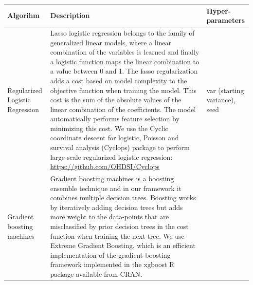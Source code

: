 \documentclass[]{article}
\begin{document}
\begin{longtable}[]{@{}lll@{}}
\toprule
\begin{minipage}[b]{0.12\columnwidth}\raggedright\strut
Algorihm\strut
\end{minipage} & \begin{minipage}[b]{0.55\columnwidth}\raggedright\strut
Description\strut
\end{minipage} & \begin{minipage}[b]{0.25\columnwidth}\raggedright\strut
Hyper-parameters\strut
\end{minipage}\tabularnewline
\midrule
\endhead
\begin{minipage}[t]{0.12\columnwidth}\raggedright\strut
Regularized Logistic Regression\strut
\end{minipage} & \begin{minipage}[t]{0.55\columnwidth}\raggedright\strut
Lasso logistic regression belongs to the family of generalized linear
models, where a linear combination of the variables is learned and
finally a logistic function maps the linear combination to a value
between 0 and 1. The lasso regularization adds a cost based on model
complexity to the objective function when training the model. This cost
is the sum of the absolute values of the linear combination of the
coefficients. The model automatically performs feature selection by
minimizing this cost. We use the Cyclic coordinate descent for logistic,
Poisson and survival analysis (Cyclops) package to perform large-scale
regularized logistic regression:
\url{https://github.com/OHDSI/Cyclops}\strut
\end{minipage} & \begin{minipage}[t]{0.25\columnwidth}\raggedright\strut
var (starting variance), seed\strut
\end{minipage}\tabularnewline
\begin{minipage}[t]{0.12\columnwidth}\raggedright\strut
Gradient boosting machines\strut
\end{minipage} & \begin{minipage}[t]{0.55\columnwidth}\raggedright\strut
Gradient boosting machines is a boosting ensemble technique and in our
framework it combines multiple decision trees. Boosting works by
iteratively adding decision trees but adds more weight to the
data-points that are misclassified by prior decision trees in the cost
function when training the next tree. We use Extreme Gradient Boosting,
which is an efficient implementation of the gradient boosting framework
implemented in the xgboost R package available from CRAN.\strut

\end{minipage}
\end{longtable}
\end{document}
